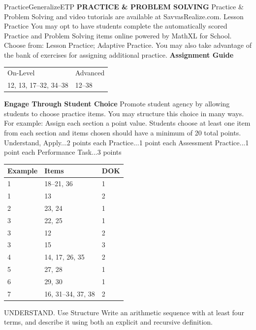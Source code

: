 \documentclass{article}
\newenvironment{item-analysis}{}{}      %
\newenvironment{practice}[2]{}{}        %
\newenvironment{te-addendum}[2]{}{}     %
\newcommand{\answer}[1]{}               %
\newcommand{\placeholder}[2]{}          %
\newcommand{\te}[1]{}                   %
\begin{document}
\begin{te-addendum}{Practice}{GeneralizeETP}
\textbf{PRACTICE \& PROBLEM SOLVING}
Practice \& Problem Solving and video tutorials are available at SavvasRealize.com.
Lesson Practice You may opt to have students complete the automatically scored Practice and Problem Solving items online powered by MathXL for School.
Choose from: Lesson Practice; Adaptive Practice.
You may also take advantage of the bank of exercises for assigning additional practice.
\textbf{Assignment Guide}
\begin{tabular}{ll}
On-Level & Advanced \\
12, 13, 17--32, 34--38 & 12--38 \\
\end{tabular}
\textbf{Engage Through Student Choice}
Promote student agency by allowing students to choose practice items. You may structure this choice in many ways.
For example:
Assign each section a point value. Students choose at least one item from each section and items chosen should have a minimum of 20 total points.
Understand, Apply...2 points each
Practice...1 point each
Assessment Practice...1 point each
Performance Task...3 points
\te{Scan the QR code to access a video tutorial.}
\placeholder{diagram}{Black and white square QR code above Practice, under the banner Scan the QR code to access a video tutorial.}
\end{te-addendum}
\begin{item-analysis}
\begin{tabular}{lll}
\toprule
Example & Items & DOK \\
\midrule
1 & 18--21, 36 & 1 \\
1 & 13 & 2 \\
2 & 23, 24 & 1 \\
3 & 22, 25 & 1 \\
3 & 12 & 2 \\
3 & 15 & 3 \\
4 & 14, 17, 26, 35 & 2 \\
5 & 27, 28 & 1 \\
6 & 29, 30 & 1 \\
7 & 16, 31--34, 37, 38 & 2 \\
\bottomrule
\end{tabular}
\end{item-analysis}
\begin{practice}{12}{2}
UNDERSTAND. Use Structure Write an arithmetic sequence with at least four terms, and describe it using both an explicit and recursive definition.
\answer{Answers may vary. Sample: (17,11,5,-1,\ldots). Explicit formula: (a_n=17-6(n-1)). Recursive formula: (a_n=\begin{cases}17,&\text{if }n=1\\a_{n-1}-6,&\text{if }n>1\end{cases}).}
\end{practice}
\end{document}
